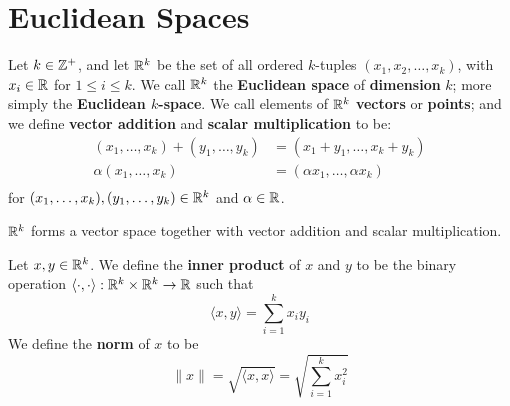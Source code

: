 \section{Euclidean Spaces}\label{section_2.4}

\begin{definition}
  Let $k \in \mathbb{Z}^+$, and let $\mathbb{R}^k$ be the set of all ordered  $k$-tuples
  $(x_1,x_2, \dots, x_k)$, with $x_i \in \mathbb{R}$ for  $1 \leq i \leq k$. We call $\mathbb{R}^k$
  the \textbf{Euclidean space} of \textbf{dimension} $k$; more simply  the
  \textbf{Euclidean $k$-space}. We call elements of  $\mathbb{R}^k$  \textbf{vectors} or
  \textbf{points}; and we define \textbf{vector addition} and \textbf{scalar
  multiplication} to be:
  \begin{align*}
    (x_1, \dots, x_k)+(y_1, \dots, y_k) &= (x_1+y_1, \dots, x_k+y_k) \\
    \alpha(x_1, \dots, x_k) &= (\alpha x_1, \dots, \alpha x_k) \\
  \end{align*}
  for $(x_1, \dots, x_k),(y_1, \dots, y_k) \in \mathbb{R}^k$ and $\alpha \in \mathbb{R}$.
\end{definition}

\begin{theorem}\label{theorem_1.5.1}
  $\mathbb{R}^k$ forms a vector space together with vector addition and scalar
  multiplication.
\end{theorem}

\begin{definition}
  Let $x,y \in \mathbb{R}^k$. We define the \textbf{inner product} of  $x$ and  $y$ to be
  the binary operation $\langle \cdot , \cdot \rangle: \mathbb{R}^k \times \mathbb{R}^k
  \rightarrow \mathbb{R}$ such that
  \begin{equation*}
    \langle x,y \rangle=\sum_{i=1}^{k}{x_iy_i}
  \end{equation*}
  We define the  \textbf{norm} of  $x$ to be
  \begin{equation*}
    \|x\|=\sqrt{\langle x,x \rangle}=\sqrt{\sum_{i=1}^k{x_i^2}}
  \end{equation*}
  \end{definition}

